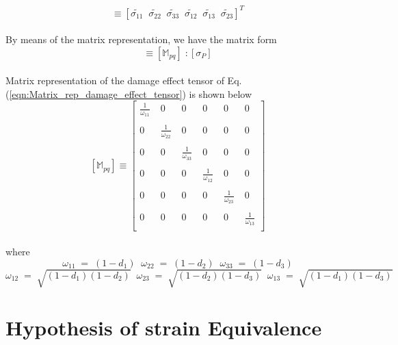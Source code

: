 \documentclass[12pt]{report}
\begin{document}
\begin{equation}
   [\tilde{\sigma_{P}}]  \equiv  [\tilde{\sigma_{11}} \;\; \tilde{\sigma_{22}} \;\;\tilde{\sigma_{33}} \;\;\tilde{\sigma_{12}} \;\;\tilde{\sigma_{13}} \;\;\tilde{\sigma_{23}} ]^{T}
\end{equation}
\\
By means of the matrix representation, we have the matrix form
\begin{equation}
[\tilde{\sigma_{P}}] \equiv [\mathbb{M}_{pq}]\;: [\sigma_{P}]
\label{eqn:Matrix_rep_damage_effect_tensor}
\end{equation}
\\
Matrix representation of the damage effect tensor of Eq.(\ref{eqn:Matrix_rep_damage_effect_tensor}) is shown below
\\
$$
[\mathbb{M}_{pq}] \equiv   
 \begin{bmatrix}
   \frac{1}{\omega_{11}}  \; & 0 \; & 0 \; & 0 \; & 0\; & 0 \\
  \\
  0\; & \frac{1}{\omega_{22}}\; & 0\; & 0\; & 0\; & 0 \\
  \\
  0\; & 0 \; & \frac{1}{\omega_{33}}\; & 0\; & 0\; & 0 \\
  \\
  0\; & 0\; & 0\; & \frac{1}{\omega_{12}}\; & 0\; & 0 \\
  \\
  0\; & 0\; & 0\; & 0\; & \frac{1}{\omega_{23}}\; & 0 \\
  \\
  0\; & 0\; & 0\; & 0\; & 0\; & \frac{1}{\omega_{13}}  
  \\
 \end{bmatrix}
 \label{Damage_effect_tensor}
 $$
\\
where
$$\omega_{11} \; = \; (1 - d_{1}) \;\;  \omega_{22} \; = \; (1 - d_{2}) \;\; \omega_{33} \; = \; (1 - d_{3})$$ \vspace*{0.1cm} $$\omega_{12} \; = \; \sqrt{(1 - d_{1})(1 - d_{2})}  \;\;\omega_{23} \; = \; \sqrt{(1 - d_{2})(1 - d_{3})} \;\; \omega_{13} \; = \; \sqrt{(1 - d_{1})(1 - d_{3})}$$

\section{Hypothesis of strain Equivalence}\label{Hypothesis of Strain Equivalence}
\end{document}
